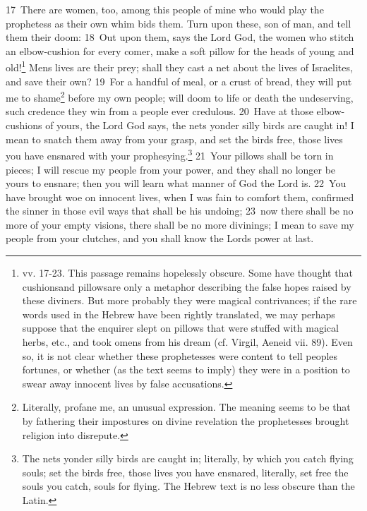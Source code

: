 \documentclass[10pt]{book} %
\begin{document}
\textcolor{benred8}{17}~There are women, too, among this people of mine who would play the prophetess as their own whim bids them. Turn upon these, son of man, and tell them their doom: \textcolor{benred8}{18}~Out upon them, says the Lord God, the women who stitch an elbow-cushion for every comer, make a soft pillow for the heads of young and old!\footnote[2]{vv. 17-23. This passage remains hopelessly obscure. Some have thought that \textasciigrave cushions\textquotesingle  and \textasciigrave pillows\textquotesingle  are only a metaphor describing the false hopes raised by these diviners. But more probably they were magical contrivances; if the rare words used in the Hebrew have been rightly translated, we may perhaps suppose that the enquirer slept on pillows that were stuffed with magical herbs, etc., and took omens from his dream (cf. Virgil, Aeneid vii. 89). Even so, it is not clear whether these prophetesses were content to tell people\textquotesingle s fortunes, or whether (as the text seems to imply) they were in a position to swear away innocent lives by false accusations.} Men\textquotesingle s lives are their prey; shall they cast a net about the lives of Israelites, and save their own? \textcolor{benred8}{19}~For a handful of meal, or a crust of bread, they will put me to shame\footnote[3]{Literally, \textasciigrave profane me\textquotesingle , an unusual expression. The meaning seems to be that by fathering their impostures on divine revelation the prophetesses brought religion into disrepute.} before my own people; will doom to life or death the undeserving, such credence they win from a people ever credulous. \textcolor{benred8}{20}~Have at those elbow-cushions of yours, the Lord God says, the nets yonder silly birds are caught in! I mean to snatch them away from your grasp, and set the birds free, those lives you have ensnared with your prophesying.\footnote[4]{\textasciigrave The nets yonder silly birds are caught in\textquotesingle ; literally, \textasciigrave by which you catch flying souls\textquotesingle ; \textasciigrave set the birds free, those lives you have ensnared\textquotesingle , literally, \textasciigrave set free the souls you catch, souls for flying\textquotesingle . The Hebrew text is no less obscure than the Latin.} \textcolor{benred8}{21}~Your pillows shall be torn in pieces; I will rescue my people from your power, and they shall no longer be yours to ensnare; then you will learn what manner of God the Lord is. \textcolor{benred8}{22}~You have brought woe on innocent lives, when I was fain to comfort them, confirmed the sinner in those evil ways that shall be his undoing; \textcolor{benred8}{23}~now there shall be no more of your empty visions, there shall be no more divinings; I mean to save my people from your clutches, and you shall know the Lord\textquotesingle s power at last.
\end{document}
